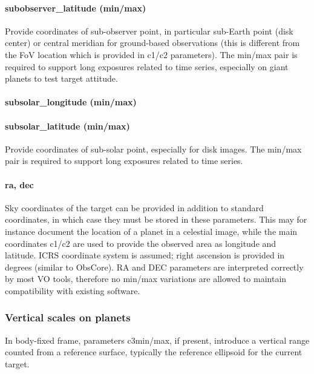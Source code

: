\documentclass[11pt,a4paper]{ivoa}
\begin{document}
\paragraph{subobserver\_latitude (min/max)}
\vspace{-15pt}
Provide coordinates of sub-observer point, in particular sub-Earth
point (disk center) or central meridian for ground-based observations
(this is different from the FoV location which is provided in c1/c2
parameters). The min/max pair is required to support long exposures
related to time series, especially on giant planets to test target
attitude.

\paragraph{subsolar\_longitude (min/max)}

\paragraph{subsolar\_latitude (min/max)}
\vspace{-15pt}
Provide coordinates of sub-solar point, especially for disk images.
The min/max pair is required to support long exposures
related to time series.

\paragraph{ra, dec}

Sky coordinates of the target can be provided in addition to standard
coordinates, in which case they must be stored in these parameters.
This may for instance document the location of a planet
in a celestial image,
while the main coordinates c1/c2 are used to provide the observed area as
longitude and latitude. ICRS coordinate system is assumed; right ascension
is provided in degrees (similar to ObsCore). RA and DEC parameters are
interpreted correctly by most VO tools, therefore no min/max variations
are allowed to maintain compatibility with existing software.

\subsubsection{Vertical scales on planets}

In body-fixed frame, parameters c3min/max, if present, introduce a
vertical range counted from a reference surface, typically the reference
ellipsoid for the current target. \\
\end{document}
